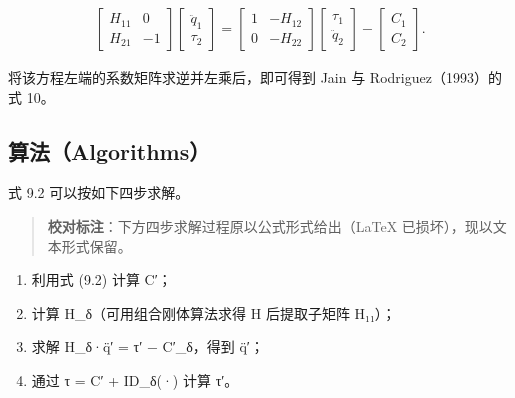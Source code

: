 \documentclass[10pt,a4paper]{book}
\theoremstyle{thmstyle} %
\theoremstyle{defstyle} %
\theoremstyle{prostyle} %
\begin{document}
$$
\begin{array}{r} { \left[ \begin{array}{ll} { H _ { 11 } } & { 0 } \\{ H _ { 21 } } & { - 1 } \end{array} \right] \left[ \begin{array}{l} { \ddot { q } _ { 1 } } \\{ \tau _ { 2 } } \end{array} \right] = \left[ \begin{array}{ll} { 1 } & { - H _ { 12 } } \\{ 0 } & { - H _ { 22 } } \end{array} \right] \left[ \begin{array}{l} { \tau _ { 1 } } \\{ \ddot { q } _ { 2 } } \end{array} \right] - \left[ \begin{array}{l} { C _ { 1 } } \\{ C _ { 2 } } \end{array} \right] . } \end{array}
$$



将该方程左端的系数矩阵求逆并左乘后，即可得到 Jain 与 Rodriguez（1993）的式 10。



\subsection{算法（Algorithms）}





式 9.2 可以按如下四步求解。



\begin{quote}

\textbf{校对标注}：下方四步求解过程原以公式形式给出（LaTeX 已损坏），现以文本形式保留。

\end{quote}





\begin{enumerate}

  \item 利用式 (9.2) 计算 C′；

  \item 计算 H\_δ（可用组合刚体算法求得 H 后提取子矩阵 H₁₁）；

  \item 求解 H\_δ·q̈′ = τ′ − C′\_δ，得到 q̈′；

  \item 通过 τ = C′ + ID\_δ(·) 计算 τ′。

\end{enumerate}
\end{document}
